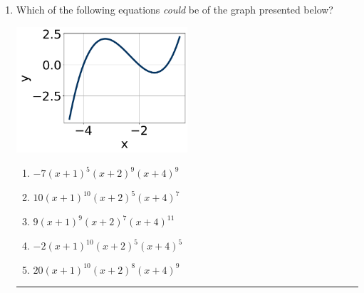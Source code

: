 \documentclass[14pt]{extbook}
\newcommand{\litem}[1]{\item#1\hspace*{-1cm}\rule{\textwidth}{0.4pt}}
\begin{document}
\begin{enumerate}
{\begin{enumerate}[label=\Alph*.]
\end{enumerate} }
\litem{
Which of the following equations \textit{could} be of the graph presented below?
\begin{center}
    \includegraphics[width=0.5\textwidth]{../Figures/polyGraphToFunctionA.png}
\end{center}
\begin{enumerate}[label=\Alph*.]
\item \( -7(x + 1)^{5} (x + 2)^{9} (x + 4)^{9} \)
\item \( 10(x + 1)^{10} (x + 2)^{5} (x + 4)^{7} \)
\item \( 9(x + 1)^{9} (x + 2)^{7} (x + 4)^{11} \)
\item \( -2(x + 1)^{10} (x + 2)^{5} (x + 4)^{5} \)
\item \( 20(x + 1)^{10} (x + 2)^{8} (x + 4)^{9} \)


\end{enumerate}}
\end{enumerate}
\end{document}

